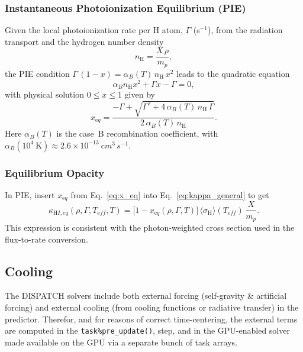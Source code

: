 \documentclass[paper=a4,fontsize=11pt]{scrartcl}
\numberwithin{equation}{section}		%
\numberwithin{figure}{section}			%
\numberwithin{table}{section}				%
\begin{document}
\subsubsection{Instantaneous Photoionization Equilibrium (PIE)}

Given the local photoionization rate per H atom, $\Gamma$ (s$^{-1}$), from the radiation transport and the hydrogen number density
\begin{equation}
n_{\mathrm H} = \frac{X\,\rho}{m_p},
\end{equation}
the PIE condition $\Gamma\,(1-x) = \alpha_B(T)\,n_{\mathrm H}\,x^2$ leads to the quadratic equation
\begin{equation}
\alpha_B n_{\mathrm H} x^2 + \Gamma x - \Gamma = 0,
\end{equation}
with physical solution $0 \le x \le 1$ given by
\begin{equation}
x_{\mathrm eq} = \frac{-\Gamma + \sqrt{\Gamma^2 + 4\,\alpha_B(T)\,n_{\mathrm H}\,\Gamma}}{2\,\alpha_B(T)\,n_{\mathrm H}}.
\label{eq:x_eq}
\end{equation}
Here $\alpha_B(T)$ is the case~B recombination coefficient, with $\alpha_B(10^4 \ {\mathrm K})\approx 2.6\times 10^{-13}\ {\mathrm cm^3\,s^{-1}}$.

\subsubsection{Equilibrium Opacity}

In PIE, insert $x_{\mathrm eq}$ from Eq.~\eqref{eq:x_eq} into Eq.~\eqref{eq:kappa_general} to get
\begin{equation}
\kappa_{\mathrm HI,eq}(\rho,\Gamma,T_{\mathrm eff},T) = \big[1-x_{\mathrm eq}(\rho,\Gamma,T)\big] \,
\langle\sigma_{\mathrm H}\rangle(T_{\mathrm eff}) \, \frac{X}{m_p}.
\end{equation}
This expression is consistent with the photon-weighted cross section used in the flux-to-rate conversion.


\subsection{Cooling}
The DISPATCH solvers include both external forcing (self-gravity \& artificial forcing) and external cooling (from cooling functions or radiative transfer) in the predictor.   Therefor, and for reasons of correct time-centering, the external terms are computed in the \verb|task%pre_update()|, step, and in the GPU-enabled solver made available on the GPU via a separate bunch of task arrays.
\end{document}
